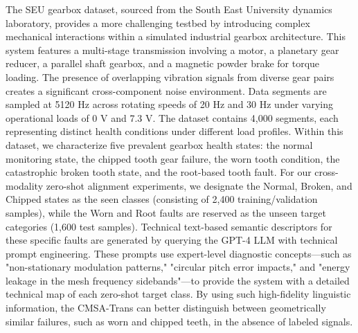 The SEU gearbox dataset, sourced from the South East University dynamics laboratory, provides a more challenging testbed by introducing complex mechanical interactions within a simulated industrial gearbox architecture. This system features a multi-stage transmission involving a motor, a planetary gear reducer, a parallel shaft gearbox, and a magnetic powder brake for torque loading. The presence of overlapping vibration signals from diverse gear pairs creates a significant cross-component noise environment. Data segments are sampled at 5120 Hz across rotating speeds of 20 Hz and 30 Hz under varying operational loads of 0 V and 7.3 V. The dataset contains 4,000 segments, each representing distinct health conditions under different load profiles. Within this dataset, we characterize five prevalent gearbox health states: the normal monitoring state, the chipped tooth gear failure, the worn tooth condition, the catastrophic broken tooth state, and the root-based tooth fault. For our cross-modality zero-shot alignment experiments, we designate the Normal, Broken, and Chipped states as the seen classes (consisting of 2,400 training/validation samples), while the Worn and Root faults are reserved as the unseen target categories (1,600 test samples). Technical text-based semantic descriptors for these specific faults are generated by querying the GPT-4 LLM with technical prompt engineering. These prompts use expert-level diagnostic concepts—such as "non-stationary modulation patterns," "circular pitch error impacts," and "energy leakage in the mesh frequency sidebands"—to provide the system with a detailed technical map of each zero-shot target class. By using such high-fidelity linguistic information, the CMSA-Trans can better distinguish between geometrically similar failures, such as worn and chipped teeth, in the absence of labeled signals.

